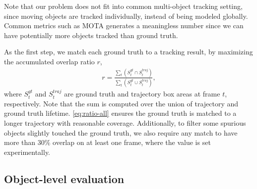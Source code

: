 Note that our problem does not fit into common multi-object tracking setting, since moving objects are tracked individually, instead of being modeled globally. Common metrics such as MOTA \cite{bernardin2008evaluating} generates a meaningless number since we can have potentially more objects tracked than ground truth.

As the first step, we match each ground truth to a tracking result, by maximizing the accumulated overlap ratio $r$, 
\begin{align}
    r=\frac{\sum_t{(S_t^{gt}\cap S_t^{traj})}}{\sum_t{(S_t^{gt}\cup S_t^{traj})}},
    \label{eq:ratio-all}
\end{align}
where $S_t^{gt}$ and $S_t^{traj}$ are ground truth and trajectory box areas at frame $t$, respectively. Note that the sum is computed over the union of trajectory and ground truth lifetime. 
\ref{eq:ratio-all} ensures the ground truth is matched to a longer trajectory with reasonable coverage. 
Additionally, to filter some spurious objects slightly touched the ground truth, we also require any match to have more than $30\%$ overlap on at least one frame, where the value is set experimentally.


\subsection{Object-level evaluation} 
\label{subsec:tracker-eval-count}


